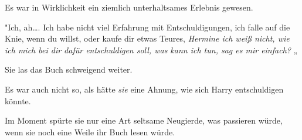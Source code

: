 Es war in Wirklichkeit ein ziemlich unterhaltsames Erlebnis gewesen.

"Ich, ah…. Ich habe nicht viel Erfahrung mit Entschuldigungen, ich falle auf die Knie, wenn du willst, oder kaufe dir etwas Teures, \emph{Hermine ich weiß nicht, wie ich mich bei dir dafür entschuldigen soll, was kann ich tun, sag es mir einfach?} „

Sie las das Buch schweigend weiter.

Es war auch nicht so, als hätte \emph{sie} eine Ahnung, wie sich Harry entschuldigen könnte.

Im Moment spürte sie nur eine Art seltsame Neugierde, was passieren würde, wenn sie noch eine Weile ihr Buch lesen würde.

